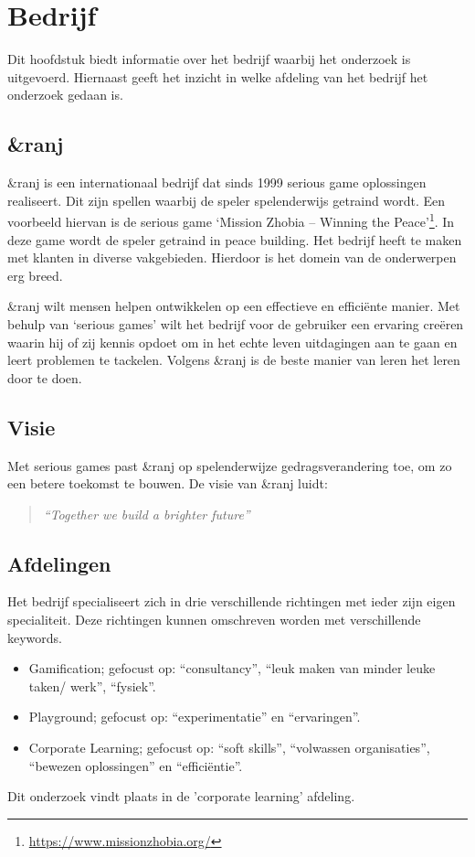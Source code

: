 \chapter{Bedrijf}
\label{ch:bedrijf}
Dit hoofdstuk biedt informatie over het bedrijf waarbij het onderzoek is uitgevoerd. Hiernaast geeft het inzicht in welke afdeling van het bedrijf het onderzoek gedaan is. 

\section{\&ranj}
\&ranj is een internationaal bedrijf dat sinds 1999 serious game oplossingen realiseert. Dit zijn spellen waarbij de speler spelenderwijs getraind wordt. Een voorbeeld hiervan is de serious game ‘Mission Zhobia – Winning the Peace’\footnote{\url{https://www.missionzhobia.org/}}. In deze game wordt de speler getraind in peace building. Het bedrijf heeft te maken met klanten in diverse vakgebieden. Hierdoor is het domein van de onderwerpen erg breed.

\&ranj wilt mensen helpen ontwikkelen op een effectieve en efficiënte manier. Met behulp van ‘serious games’ wilt het bedrijf voor de gebruiker een ervaring creëren waarin hij of zij kennis opdoet om in het echte leven uitdagingen aan te gaan en leert problemen te tackelen. Volgens \&ranj is de beste manier van leren het leren door te doen.

\section{Visie}
Met serious games past \&ranj op spelenderwijze gedragsverandering toe, om zo een betere toekomst te bouwen. De visie van \&ranj luidt:

\begin{quote} 
    \centering
    \large
    \textit{
        “Together we build a brighter future”
    }
\end{quote}

\section{Afdelingen}
Het bedrijf specialiseert zich in drie verschillende richtingen met ieder zijn eigen specialiteit. Deze richtingen kunnen omschreven worden met verschillende keywords.
\begin{itemize}
    \item Gamification; gefocust op: “consultancy”, “leuk maken van minder leuke taken/ werk”, “fysiek”.
    \item Playground; gefocust op: “experimentatie” en “ervaringen”.
    \item Corporate Learning; gefocust op: “soft skills”, “volwassen organisaties”, “bewezen oplossingen” en “efficiëntie”.
\end{itemize}
Dit onderzoek vindt plaats in de 'corporate learning’ afdeling.

